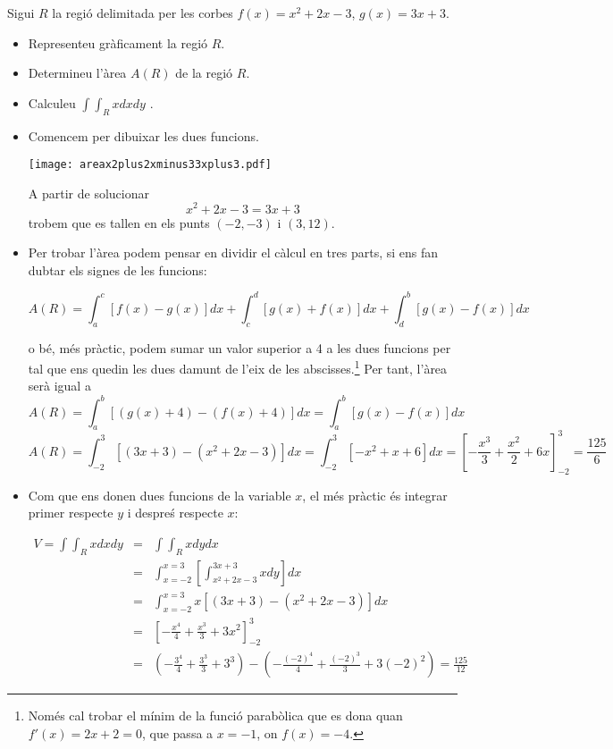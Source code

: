 \Exercise[title={Integral delimitada entre funcions}]


Sigui $R$ la regió delimitada  per les corbes $f(x)=x^2+2x-3$, $g(x)=3x+3$. 
\begin{itemize}
  
  \item Representeu gràficament la regió $R$.
  \item Determineu l'àrea $A(R)$ de la regió $R$.
  \item Calculeu $\int \int_R x dxdy$ .
\end{itemize}



\Answer

\begin{itemize}
  \item 
Comencem per dibuixar les dues funcions.

    \begin{center}
      \texttt{[image: areax2plus2xminus33xplus3.pdf]}
    \end{center}

A partir de solucionar 
\[
  x^2+2x-3=3x+3
\]
trobem que es tallen en els punts $(-2,-3)$ i $(3,12)$.

\item Per trobar l'àrea podem pensar en dividir el càlcul en tres parts, 
si ens fan dubtar els signes de les funcions:

\[
  A(R)=\int_a^c [f(x)-g(x)] dx +  \int_c^d [g(x)+f(x)] dx + \int_d^b [g(x)-f(x)] dx
\]

o bé, més pràctic, podem sumar un valor superior a 4 a les dues funcions per tal que ens quedin les dues damunt de l'eix de les abscisses.\footnote{Només cal trobar el mínim de la funció parabòlica que es dona quan $f'(x)=2x+2=0$, que passa a $x=-1$, on $f(x)=-4$.}
Per tant, l'àrea serà igual a
\[
  A(R) = \int_a^b [(g(x)+4)-(f(x)+4)] dx = \int_a^b [g(x)-f(x)] dx 
  \] 
  \[
    A(R) = \int_{-2}^{3} [(3x+3)-(x^2+2x-3)] dx =  \int_{-2}^{3} [-x^2+x+6] dx = \left[-\frac{x^3}{3}+\frac{x^2}{2}+6x\right]_{-2}^3= \frac{125}{6}
    \] 
  
\item Com que ens donen dues funcions de la variable $x$, el més pràctic és integrar primer respecte $y$ i despreś respecte $x$:

\begin{eqnarray*}
V=\int \int_R x dx dy &=& \int \int_R x dy dx\\
&=& \int_{x=-2}^{x=3} \left[ \int_{x^2+2x-3}^{3x+3} x dy \right]dx  \\
&=& \int_{x=-2}^{x=3} x [(3x+3)-(x^2+2x-3)] dx \\
&=& \left[-\frac{x^4}{4}+\frac{x^3}{3}+3x^2\right]_{-2}^3\\
&=& \left(-\frac{3^4}{4}+\frac{3^3}{3}+3^3\right)-\left(-\frac{(-2)^4}{4}+\frac{(-2)^3}{3}+3 (-2)^2\right)
=\frac{125}{12}
\end{eqnarray*}
\end{itemize}


